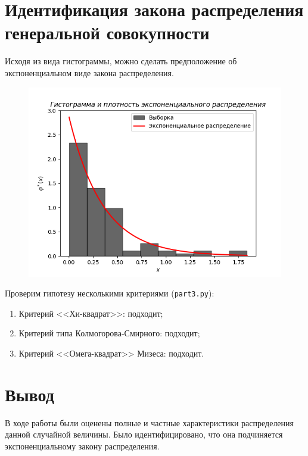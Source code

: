 \documentclass[a4paper,12pt]{article}
\begin{document}
    \section{Идентификация закона распределения генеральной совокупности}
    Исходя из вида гистограммы, можно сделать предположение об экспоненциальном
    виде закона распределения.
    \begin{figure}[H]
        \centering
        \includegraphics[width=0.7\linewidth]{polytech/stats/homework-2/subfiles/fig/3}
    \end{figure}
    Проверим гипотезу несколькими критериями (\texttt{part3.py}):
    \begin{enumerate}
        \item Критерий <<Хи-квадрат>>: подходит;
        \item Критерий типа Колмогорова-Смирного: подходит;
        \item Критерий <<Омега-квадрат>> Мизеса: подходит.
    \end{enumerate}

    \section{Вывод}
    В ходе работы были оценены полные и частные характеристики распределения данной случайной величины.
    Было идентифицировано, что она подчиняется экспоненциальному закону распределения.
    \newpage
\end{document}
